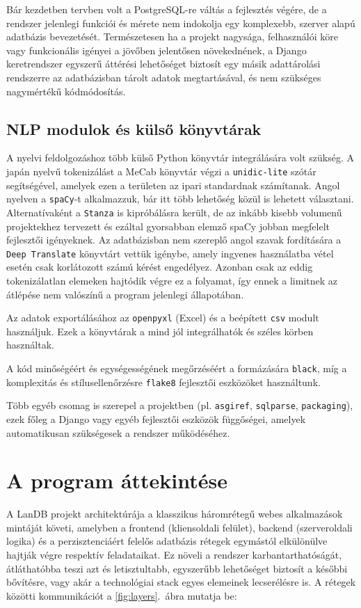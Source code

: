 Bár kezdetben tervben volt a PostgreSQL-re váltás a fejlesztés végére, de a rendszer jelenlegi funkciói és mérete nem indokolja egy komplexebb, szerver alapú adatbázis bevezetését. Természetesen ha a projekt nagysága, felhasználói köre vagy funkcionális igényei a jövőben jelentősen növekednének, a Django keretrendszer egyszerű áttérési lehetőséget biztosít egy másik adattárolási rendszerre az adatbázisban tárolt adatok megtartásával, és nem szükséges nagymértékű kódmódosítás.

\subsection{NLP modulok és külső könyvtárak}

A nyelvi feldolgozáshoz több külső Python könyvtár integrálására volt szükség. A japán nyelvű tokenizálást a MeCab könyvtár végzi a \texttt{unidic-lite} szótár segítségével, amelyek ezen a területen az ipari standardnak számítanak. Angol nyelven a \texttt{spaCy}-t alkalmazzuk, bár itt több lehetőség közül is lehetett választani. Alternatívaként a \texttt{Stanza} is kipróbálásra került, de az inkább kisebb volumenű projektekhez tervezett és ezáltal gyorsabban elemző spaCy jobban megfelelt fejlesztői igényeknek. Az adatbázisban nem szereplő angol szavak fordítására a \texttt{Deep Translate} könyvtárt vettük igénybe, amely ingyenes használatba vétel esetén csak korlátozott számú kérést engedélyez. Azonban csak az eddig tokenizálatlan elemeken hajtódik végre ez a folyamat, így ennek a limitnek az átlépése nem valószínű a program jelenlegi állapotában.

Az adatok exportálásához az \texttt{openpyxl} (Excel) és a beépített \texttt{csv} modult használjuk. Ezek a könyvtárak a mind jól integrálhatók és széles körben használtak.

A kód minőségéért és egységességének megőrzéséért a formázására \texttt{black}, míg a komplexitás és stílusellenőrzésre \texttt{flake8} fejlesztői eszközöket használtunk.

Több egyéb csomag is szerepel a projektben (pl. \texttt{asgiref}, \texttt{sqlparse}, \texttt{packaging}), ezek főleg a Django vagy egyéb fejlesztői eszközök függőségei, amelyek automatikusan szükségesek a rendszer működéséhez.

\section{A program áttekintése}

A LanDB projekt architektúrája a klasszikus háromrétegű webes alkalmazások mintáját követi, amelyben a frontend (kliensoldali felület), backend (szerveroldali logika) és a perzisztenciáért felelős adatbázis rétegek egymástól elkülönülve hajtják végre respektív feladataikat. Ez növeli a rendszer karbantarthatóságát, átláthatóbba teszi azt és letisztultabb, egyszerűbb lehetőséget biztosít a későbbi bővítésre, vagy akár a technológiai stack egyes elemeinek lecserélésre is. A rétegek közötti kommunikációt a \ref{fig:layers}.~ábra mutatja be:

